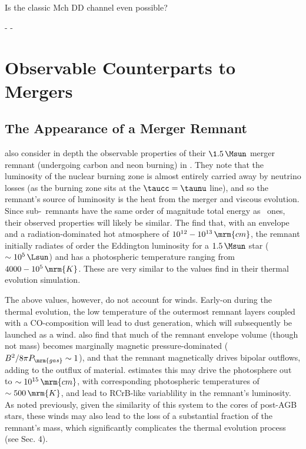 
Is the classic Mch DD channel even possible?

-
-

\section{Observable Counterparts to Mergers}

\subsection{The Appearance of a Merger Remnant}

\cite{schw+16} also consider in depth the observable properties of their $\1.5\,\Msun$ merger remnant (undergoing carbon and neon burning) in \mesa.  They note that the luminosity of the nuclear burning zone is almost entirely carried away by neutrino losses (as the burning zone sits at the $\taucc = \taunu$ line), and so the remnant's source of luminosity is the heat from the merger and viscous evolution.  Since sub-\Mch\ remnants have the same order of magnitude total energy as \Mch\ ones, their observed properties will likely be similar.  The find that, with an envelope and a radiation-dominated hot atmosphere of $10^{12}-10^{13}\,\mrm{cm}$, the remnant initially radiates of order the Eddington luminosity for a $1.5\,\Msun$ star ($\sim10^5\,\Lsun$) and has a photospheric temperature ranging from $4000 - 10^5\,\mrm{K}$.  These are very similar to the values \cite{shen+12} find in their thermal evolution simulation.

The above values, however, do not account for winds.  Early-on during the thermal evolution, the low temperature of the outermost remnant layers coupled with a CO-composition will lead to dust generation, which will subsequently be launched as a wind.  \cite{ji+13} also find that much of the remnant envelope volume (though not mass) becomes marginally magnetic pressure-dominated ($B^2/8\pi P_\mrm{gas} \sim 1$), and that the remnant magnetically drives bipolar outflows, adding to the outflux of material.  \cite{schw+16} estimates this may drive the photosphere out to $\sim10^{15}\,\mrm{cm}$, with corresponding photospheric temperatures of $\sim500\,\mrm{K}$, and lead to RCrB-like variablility in the remnant's luminosity.  As noted previously, given the similarity of this system to the cores of post-AGB stars, these winds may also lead to the loss of a substantial fraction of the remnant's mass, which significantly complicates the thermal evolution process (see \cite{schw+16} Sec. 4).

